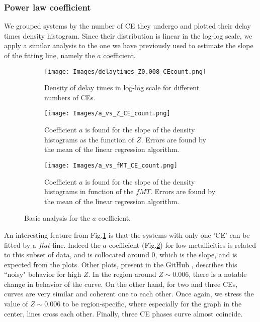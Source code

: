 \documentclass[preprint,12pt]{elsarticle}
\begin{document}
\subsubsection{\textbf{Power law coefficient}}

We grouped systems by the number of CE they undergo and plotted their delay times density histogram. Since their distribution is linear in the log-log scale, we apply a similar analysis to the one we have previously used to estimate the slope of the fitting line, namely the $a$ coefficient.

\begin{figure}[htp]
    \begin{subfigure}[t]{1\textwidth}
      \centering
      \texttt{[image: Images/delaytimes\_Z0.008\_CEcount.png]}
      \caption{Density of delay times in log-log scale for different numbers of CEs.}
      \label{img:delaytimes_count_CE}
    \end{subfigure}
    \begin{subfigure}[t]{1\textwidth}
      \centering
      \texttt{[image: Images/a\_vs\_Z\_CE\_count.png]}
      \caption{Coefficient $a$ is found for the slope of the density histograms as the  function of $Z$. Errors are found by the mean of the linear regression algorithm.}
      \label{img:a_vs_Z_CE_count}
    \end{subfigure}
    \hfill
    \begin{subfigure}[t]{1\textwidth}
      \centering
      \texttt{[image: Images/a\_vs\_fMT\_CE\_count.png]}
      \caption{Coefficient $a$ is found for the slope of the density histograms in function of the $fMT$. Errors are found by the mean of the linear regression algorithm.}
      \label{img:a_vs_fMT_CE_count}
    \end{subfigure}
    \caption{Basic analysis for the $a$ coefficient.}
  \end{figure}

An interesting feature from Fig.\ref{img:delaytimes_count_CE} is that the systems with only one 'CE' can be fitted by a $flat$ line. Indeed the $a$ coefficient (Fig.\ref{img:a_vs_Z_CE_count}) for low metallicities is related to this subset of data, and is collocated around 0, which is the slope, and is expected from the plots. Other plots, present in the GitHub \citep{github}, describes this ``noisy" behavior for high $Z$. In the region around $Z \sim 0.006$, there is a notable change in behavior of the curve. On the other hand, for two and three CEs, curves are very similar and coherent one to each other. Once again, we stress the value of $Z \sim 0.006$ to be region-specific, where especially for the graph in the center, lines cross each other. Finally, three CE phases curve almost coincide.\\
\end{document}
